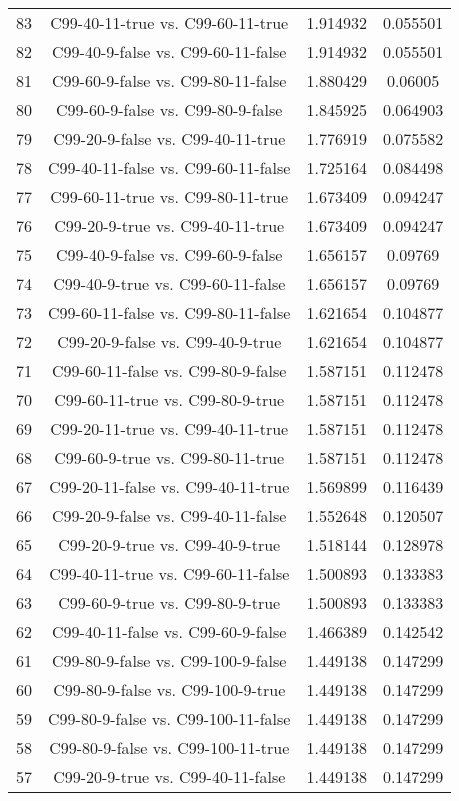 \documentclass[a4paper,10pt]{article}
\begin{document}
\begin{landscape}
\begin{table}[!htp]
\begin{tabular}{cccc}
83&C99-40-11-true vs. C99-60-11-true&1.914932&0.055501\\
82&C99-40-9-false vs. C99-60-11-false&1.914932&0.055501\\
81&C99-60-9-false vs. C99-80-11-false&1.880429&0.06005\\
80&C99-60-9-false vs. C99-80-9-false&1.845925&0.064903\\
79&C99-20-9-false vs. C99-40-11-true&1.776919&0.075582\\
78&C99-40-11-false vs. C99-60-11-false&1.725164&0.084498\\
77&C99-60-11-true vs. C99-80-11-true&1.673409&0.094247\\
76&C99-20-9-true vs. C99-40-11-true&1.673409&0.094247\\
75&C99-40-9-false vs. C99-60-9-false&1.656157&0.09769\\
74&C99-40-9-true vs. C99-60-11-false&1.656157&0.09769\\
73&C99-60-11-false vs. C99-80-11-false&1.621654&0.104877\\
72&C99-20-9-false vs. C99-40-9-true&1.621654&0.104877\\
71&C99-60-11-false vs. C99-80-9-false&1.587151&0.112478\\
70&C99-60-11-true vs. C99-80-9-true&1.587151&0.112478\\
69&C99-20-11-true vs. C99-40-11-true&1.587151&0.112478\\
68&C99-60-9-true vs. C99-80-11-true&1.587151&0.112478\\
67&C99-20-11-false vs. C99-40-11-true&1.569899&0.116439\\
66&C99-20-9-false vs. C99-40-11-false&1.552648&0.120507\\
65&C99-20-9-true vs. C99-40-9-true&1.518144&0.128978\\
64&C99-40-11-true vs. C99-60-11-false&1.500893&0.133383\\
63&C99-60-9-true vs. C99-80-9-true&1.500893&0.133383\\
62&C99-40-11-false vs. C99-60-9-false&1.466389&0.142542\\
61&C99-80-9-false vs. C99-100-9-false&1.449138&0.147299\\
60&C99-80-9-false vs. C99-100-9-true&1.449138&0.147299\\
59&C99-80-9-false vs. C99-100-11-false&1.449138&0.147299\\
58&C99-80-9-false vs. C99-100-11-true&1.449138&0.147299\\
57&C99-20-9-true vs. C99-40-11-false&1.449138&0.147299\\

\end{tabular}
\end{table}
\end{landscape}
\end{document}
